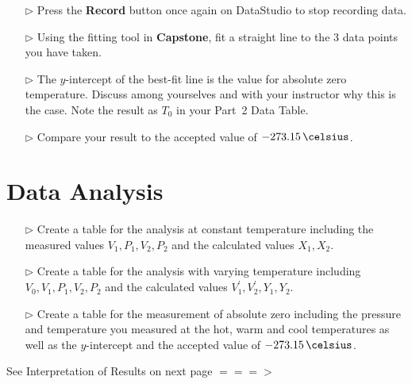 \begin{itemize}
\item[$\triangleright$] Press the \textbf{Record}  button once again on DataStudio to stop recording data.
\item[$\triangleright$] Using the fitting tool in \textbf{Capstone}, fit a straight line to the 3 data points you have taken.
\item[$\triangleright$] The $y$-intercept of the best-fit line is the value for absolute zero temperature. Discuss among yourselves and with your instructor why this is the case. Note the result as $T_{0}$ in your Part~2 Data Table.
\item[$\triangleright$] Compare your result to the accepted value of $-273.15\,\celsius$.
\end{itemize}

\section{Data Analysis}

\begin{itemize}
\item[$\triangleright$] Create a table for the analysis at constant temperature including the measured values $V_1, P_1, V_2, P_2$ and the calculated values  $X_1, X_2$.
\item[$\triangleright$] Create a table for the analysis with varying temperature including $V_0, V_1, P_1, V_2, P_2$ and the calculated values  $V^\prime_1, V^\prime_2, Y_1, Y_2$.
\item[$\triangleright$] Create a table for the measurement of absolute zero including the pressure and temperature you measured at the hot, warm and cool temperatures as well as the $y$-intercept and the accepted value of $-273.15\,\celsius$.
\end{itemize}


See Interpretation of Results on next page $===>$

\pagebreak

